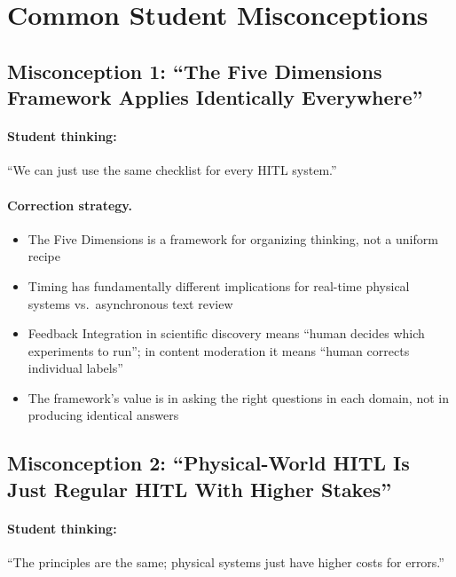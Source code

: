 \section{Common Student Misconceptions}

\subsection{Misconception 1: ``The Five Dimensions Framework Applies Identically Everywhere''}

\paragraph{Student thinking:} ``We can just use the same checklist for every HITL system.''

\paragraph{Correction strategy.}
\begin{itemize}
    \item The Five Dimensions is a framework for organizing thinking, not a uniform recipe
    \item Timing has fundamentally different implications for real-time physical systems vs.\ asynchronous text review
    \item Feedback Integration in scientific discovery means ``human decides which experiments to run''; in content moderation it means ``human corrects individual labels''
    \item The framework's value is in asking the right questions in each domain, not in producing identical answers
\end{itemize}

\subsection{Misconception 2: ``Physical-World HITL Is Just Regular HITL With Higher Stakes''}

\paragraph{Student thinking:} ``The principles are the same; physical systems just have higher costs for errors.''


